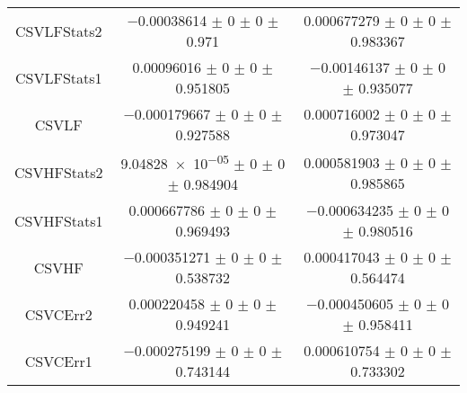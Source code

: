 \begin{table}
\begin{tabular}{ccc}
CSVLFStats2 	& \num{-0.00038614} $\pm$ \num{0} $\pm$ \num{0} $\pm$ \num{0.971} 	& \num{0.000677279} $\pm$ \num{0} $\pm$ \num{0} $\pm$ \num{0.983367}\\
CSVLFStats1 	& \num{0.00096016} $\pm$ \num{0} $\pm$ \num{0} $\pm$ \num{0.951805} 	& \num{-0.00146137} $\pm$ \num{0} $\pm$ \num{0} $\pm$ \num{0.935077}\\
CSVLF 	& \num{-0.000179667} $\pm$ \num{0} $\pm$ \num{0} $\pm$ \num{0.927588} 	& \num{0.000716002} $\pm$ \num{0} $\pm$ \num{0} $\pm$ \num{0.973047}\\
CSVHFStats2 	& \num{9.04828e-05} $\pm$ \num{0} $\pm$ \num{0} $\pm$ \num{0.984904} 	& \num{0.000581903} $\pm$ \num{0} $\pm$ \num{0} $\pm$ \num{0.985865}\\
CSVHFStats1 	& \num{0.000667786} $\pm$ \num{0} $\pm$ \num{0} $\pm$ \num{0.969493} 	& \num{-0.000634235} $\pm$ \num{0} $\pm$ \num{0} $\pm$ \num{0.980516}\\
CSVHF 	& \num{-0.000351271} $\pm$ \num{0} $\pm$ \num{0} $\pm$ \num{0.538732} 	& \num{0.000417043} $\pm$ \num{0} $\pm$ \num{0} $\pm$ \num{0.564474}\\
CSVCErr2 	& \num{0.000220458} $\pm$ \num{0} $\pm$ \num{0} $\pm$ \num{0.949241} 	& \num{-0.000450605} $\pm$ \num{0} $\pm$ \num{0} $\pm$ \num{0.958411}\\
CSVCErr1 	& \num{-0.000275199} $\pm$ \num{0} $\pm$ \num{0} $\pm$ \num{0.743144} 	& \num{0.000610754} $\pm$ \num{0} $\pm$ \num{0} $\pm$ \num{0.733302}\\
\bottomrule
\end{tabular}
\end{table}